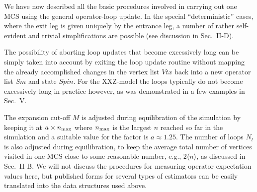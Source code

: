 \documentclass[10pt,pre,aps,twocolumn,showpacs,superscriptaddress,
floatfix]{revtex4}
\begin{document}
We have now described all the basic procedures involved in carrying out one 
MCS using the general operator-loop update. In the special ``deterministic'' 
cases, where the exit leg is given uniquely by the entrance leg, a number of 
rather self-evident and trivial simplifications are possible (see discussion
in Sec.~II-D).

The possibility of aborting loop updates that become excessively long can 
be simply taken into account by exiting the loop update routine without 
mapping the already accomplished changes in the vertex list $Vtx$ back into 
a new operator list $Sm$ and state $Spin$. For the XXZ-model the loops 
typically do not become excessively long in practice however, as was 
demonstrated in a few examples in Sec.~V. 

The expansion cut-off $M$ is adjusted during equilibration
of the simulation by keeping it at $a\times n_{\rm max}$ where $n_{\rm max}$ 
is the largest $n$ reached so far in the simulation and a suitable value for 
the factor is $a \approx 1.25$. The number of loops $N_l$ is also adjusted 
during equilibration, to keep the average total number of vertices visited
in one MCS close to some reasonable number, e.g., $2\langle n\rangle$, as 
discussed in Sec.~II B.  We will not discuss the procedures 
for measuring operator expectation values here, but published forms for 
several types of estimators \cite{sse2,sse4,dorneich2} can be easily 
translated into the data structures used above.
\end{document}
